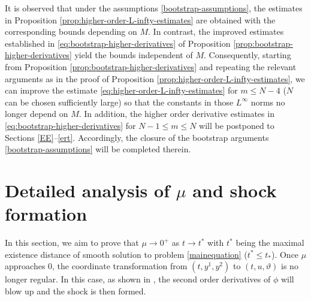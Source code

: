 \documentclass[11pt,twoside]{article}
\begin{document}
It is observed that under the assumptions \eqref{bootstrap-assumptions},
the estimates in Proposition \ref{prop:higher-order-L-infty-estimates} are obtained with
the corresponding bounds depending on $M$.
In contrast, the improved estimates established in \eqref{eq:bootstrap-higher-derivatives} of Proposition \ref{prop:bootstrap-higher-derivatives} yield the bounds independent of $M$.
Consequently, starting from Proposition \ref{prop:bootstrap-higher-derivatives}
and repeating the relevant arguments as in the proof of Proposition \ref{prop:higher-order-L-infty-estimates},
we can improve the estimate \eqref{eq:higher-order-L-infty-estimates} for $m \leq N-4$ ($N$ can be chosen sufficiently large)
so that the constants in those $L^\infty$ norms no longer depend on $M$. In addition,
the higher order derivative estimates in \eqref{eq:bootstrap-higher-derivatives} for $N-1\leq m\leq N$
will be postponed to Sections \ref{EE}--\ref{ert}. Accordingly, the closure of the bootstrap arguments \eqref{bootstrap-assumptions} will
be completed therein.





\section{Detailed analysis of $\mu$ and shock formation}\label{Sectionmu}
In this section, we aim to prove that $\mu \to 0^+$ as $t \to t^*$ with $t^*$ being the maximal
existence distance of smooth solution to problem \eqref{mainequation} ($t^*\le t_*$). Once $\mu$ approaches $0$, the coordinate transformation
from $(t, y^1, y^2)$ to $(t, u, \vartheta)$ is no longer regular. In this case, as shown in \cite{Ch1, Sp, M-Y},
the second order derivatives of $\phi$ will blow up and the shock is then formed.
\end{document}
